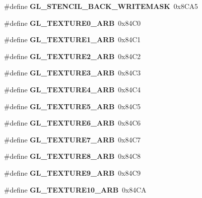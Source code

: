 \begin{DoxyCompactItemize}
\item 
\#define {\bfseries G\+L\+\_\+\+S\+T\+E\+N\+C\+I\+L\+\_\+\+B\+A\+C\+K\+\_\+\+W\+R\+I\+T\+E\+M\+A\+S\+K}~0x8\+C\+A5\label{_s_d_l__opengl_8h_a3e0903a295456617def915dbc0932a3a}

\item 
\#define {\bfseries G\+L\+\_\+\+T\+E\+X\+T\+U\+R\+E0\+\_\+\+A\+R\+B}~0x84\+C0\label{_s_d_l__opengl_8h_a52f7e4ad7d25b51800d52f7cf4459a39}

\item 
\#define {\bfseries G\+L\+\_\+\+T\+E\+X\+T\+U\+R\+E1\+\_\+\+A\+R\+B}~0x84\+C1\label{_s_d_l__opengl_8h_affdf381031ef9f48ddf76805cdf8d0a5}

\item 
\#define {\bfseries G\+L\+\_\+\+T\+E\+X\+T\+U\+R\+E2\+\_\+\+A\+R\+B}~0x84\+C2\label{_s_d_l__opengl_8h_a5c56f2e8fd1ca5abe5f47e76036ec2d5}

\item 
\#define {\bfseries G\+L\+\_\+\+T\+E\+X\+T\+U\+R\+E3\+\_\+\+A\+R\+B}~0x84\+C3\label{_s_d_l__opengl_8h_ad379be7cb9fd935261564bca80457188}

\item 
\#define {\bfseries G\+L\+\_\+\+T\+E\+X\+T\+U\+R\+E4\+\_\+\+A\+R\+B}~0x84\+C4\label{_s_d_l__opengl_8h_adbe2a3237c679830c2d077f20bef8b2e}

\item 
\#define {\bfseries G\+L\+\_\+\+T\+E\+X\+T\+U\+R\+E5\+\_\+\+A\+R\+B}~0x84\+C5\label{_s_d_l__opengl_8h_ac11d76fda26a77a8017a9d4397f742fa}

\item 
\#define {\bfseries G\+L\+\_\+\+T\+E\+X\+T\+U\+R\+E6\+\_\+\+A\+R\+B}~0x84\+C6\label{_s_d_l__opengl_8h_a5e44a9dbcc6b13ad4564f259d6a5285d}

\item 
\#define {\bfseries G\+L\+\_\+\+T\+E\+X\+T\+U\+R\+E7\+\_\+\+A\+R\+B}~0x84\+C7\label{_s_d_l__opengl_8h_a0cb625355976404d3f15e24225beaf4a}

\item 
\#define {\bfseries G\+L\+\_\+\+T\+E\+X\+T\+U\+R\+E8\+\_\+\+A\+R\+B}~0x84\+C8\label{_s_d_l__opengl_8h_ab9964f4ef836cd122d7771e69a32fdce}

\item 
\#define {\bfseries G\+L\+\_\+\+T\+E\+X\+T\+U\+R\+E9\+\_\+\+A\+R\+B}~0x84\+C9\label{_s_d_l__opengl_8h_ade4ab7cb48946653986aea05ebca4886}

\item 
\#define {\bfseries G\+L\+\_\+\+T\+E\+X\+T\+U\+R\+E10\+\_\+\+A\+R\+B}~0x84\+C\+A\label{_s_d_l__opengl_8h_a22e31ae0c89419041f5c0f2c03d0e5ec}


\end{DoxyCompactItemize}
